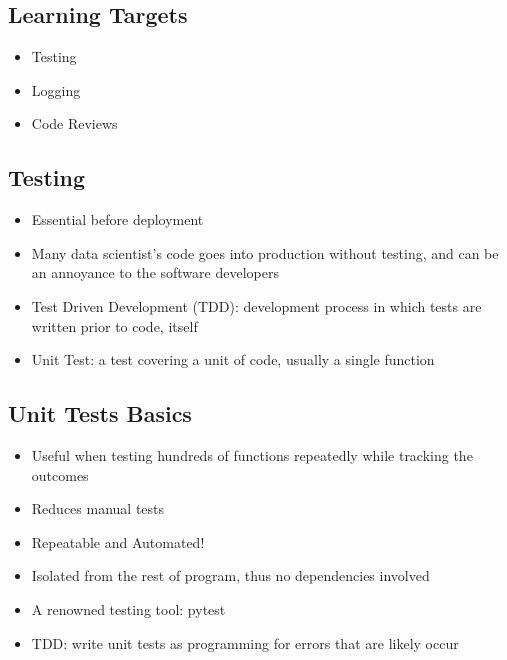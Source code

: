 
\subsection{Learning Targets}
\begin{itemize}
	\item Testing
	\item Logging
	\item Code Reviews
\end{itemize}

\subsection{Testing}
\begin{itemize}
	\item Essential before deployment
	\item Many data scientist's code goes into production without testing, and can be an annoyance to the software developers
	\item Test Driven Development (TDD): development process in which tests are written prior to code, itself
	\item Unit Test: a test covering a unit of code, usually a single function
\end{itemize}

\subsection{Unit Tests Basics}
\begin{itemize}
	\item Useful when testing hundreds of functions repeatedly while tracking the outcomes
	\item Reduces manual tests
	\item Repeatable and Automated!
	\item Isolated from the rest of program, thus no dependencies involved
	\item A renowned testing tool: pytest
	\item TDD: write unit tests as programming for errors that are likely occur
\end{itemize}

